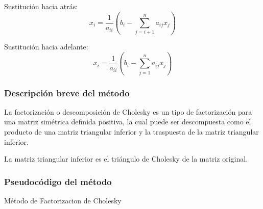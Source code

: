 \documentclass[12pt]{article}
\begin{document}
Sustitución hacia atrás:
\vspace{1mm}
\[
       x_i = \frac{1}{a_{ii}}(b_i-\sum_{j=i+1}^{n}a_{ij}x_{j})
\]

Sustitución hacia adelante:
\vspace{1mm}
\[
       x_i = \frac{1}{a_{ii}}(b_i-\sum_{j=1}^{n}a_{ij}x_{j})
\]

\subsubsection{Descripción breve del método}
La factorización o descomposición de Cholesky es un tipo de
factorización para una matriz simétrica definida positiva, la cual
puede ser descompuesta como el producto de una matriz triangular
inferior y la traspuesta de la matriz triangular inferior.

La matriz triangular inferior es el triángulo de Cholesky de la matriz
original.

\subsubsection{Pseudocódigo del método}
\begin{algorithm}[H]
\caption{Método de Factorizacion de Cholesky}
    \SetAlgoLined
    
    
    
\end{algorithm}
\end{document}
